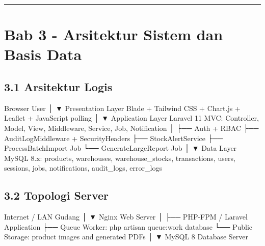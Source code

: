 \documentclass[
]{article}
\newenvironment{Shaded}{}{}
\newcommand{\NormalTok}[1]{#1}
\begin{document}
\begin{center}\rule{0.5\linewidth}{0.5pt}\end{center}

\section{Bab 3 - Arsitektur Sistem dan Basis
Data}\label{bab-3---arsitektur-sistem-dan-basis-data}

\subsection{3.1 Arsitektur Logis}\label{31-arsitektur-logis}

\begin{Shaded}
\begin{Highlighting}[]
\NormalTok{Browser User}
\NormalTok{  │}
\NormalTok{  ▼}
\NormalTok{Presentation Layer}
\NormalTok{Blade + Tailwind CSS + Chart.js + Leaflet + JavaScript polling}
\NormalTok{  │}
\NormalTok{  ▼}
\NormalTok{Application Layer}
\NormalTok{Laravel 11 MVC: Controller, Model, View, Middleware, Service, Job, Notification}
\NormalTok{  │}
\NormalTok{  ├── Auth + RBAC}
\NormalTok{  ├── AuditLogMiddleware + SecurityHeaders}
\NormalTok{  ├── StockAlertService}
\NormalTok{  ├── ProcessBatchImport Job}
\NormalTok{  └── GenerateLargeReport Job}
\NormalTok{  │}
\NormalTok{  ▼}
\NormalTok{Data Layer}
\NormalTok{MySQL 8.x: products, warehouses, warehouse\_stocks, transactions, users, sessions,}
\NormalTok{jobs, notifications, audit\_logs, error\_logs}
\end{Highlighting}
\end{Shaded}

\subsection{3.2 Topologi Server}\label{32-topologi-server}

\begin{Shaded}
\begin{Highlighting}[]
\NormalTok{Internet / LAN Gudang}
\NormalTok{  │}
\NormalTok{  ▼}
\NormalTok{Nginx Web Server}
\NormalTok{  │}
\NormalTok{  ├── PHP{-}FPM / Laravel Application}
\NormalTok{  ├── Queue Worker: php artisan queue:work database}
\NormalTok{  └── Public Storage: product images and generated PDFs}
\NormalTok{  │}
\NormalTok{  ▼}
\NormalTok{MySQL 8 Database Server}
\end{Highlighting}
\end{Shaded}
\end{document}
